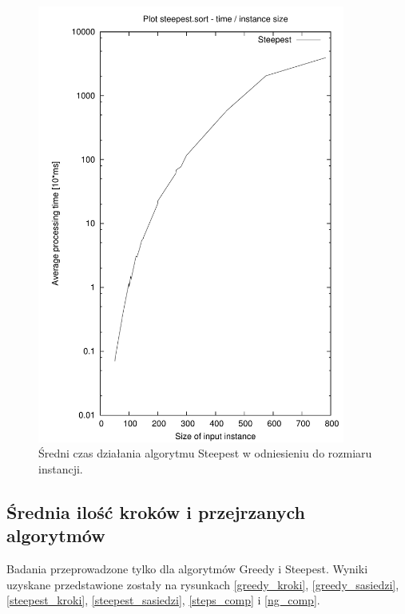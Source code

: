 \begin{figure}
\begin{center}
\includegraphics[width=0.9\textwidth]{wykresy/steepest_time}
\end{center}
\caption{Średni czas działania algorytmu Steepest w odniesieniu do rozmiaru instancji.}
\label{steepest_time}
\end{figure}

\subsection{Średnia ilość kroków i przejrzanych algorytmów}

Badania przeprowadzone tylko dla algorytmów Greedy i Steepest. Wyniki uzyskane przedstawione 
zostały na rysunkach \ref{greedy_kroki}, \ref{greedy_sasiedzi}, \ref{steepest_kroki}, \ref{steepest_sasiedzi},
\ref{steps_comp} i \ref{ng_comp}.


